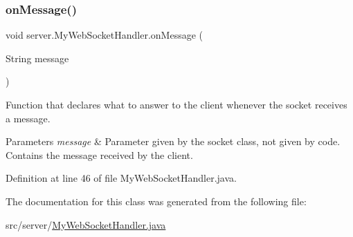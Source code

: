 \subsubsection{\texorpdfstring{on\+Message()}{onMessage()}}
{\footnotesize\ttfamily void server.\+My\+Web\+Socket\+Handler.\+on\+Message (\begin{DoxyParamCaption}\item[{String}]{message }\end{DoxyParamCaption})}

Function that declares what to answer to the client whenever the socket receives a message. 
\begin{DoxyParams}{Parameters}
{\em message} & Parameter given by the socket class, not given by code. Contains the message received by the client. \\
\hline
\end{DoxyParams}


Definition at line 46 of file My\+Web\+Socket\+Handler.\+java.



The documentation for this class was generated from the following file\+:\begin{DoxyCompactItemize}
\item 
src/server/\hyperlink{_my_web_socket_handler_8java}{My\+Web\+Socket\+Handler.\+java}\end{DoxyCompactItemize}
